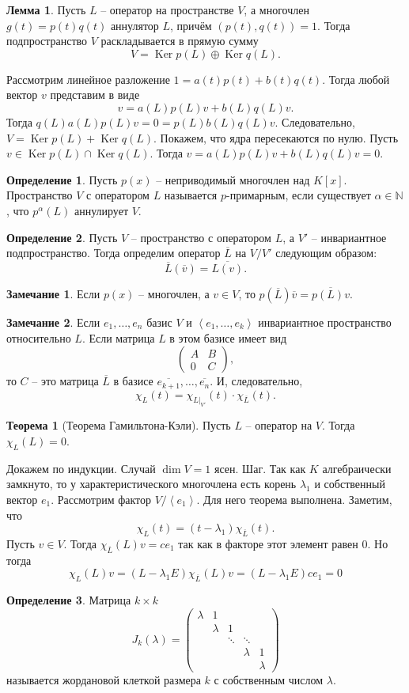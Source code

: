 \documentclass[10pt,a4paper,oneside]{book} %
\theoremstyle{definition}
\newtheorem*{rem}{Замечание}
\newtheorem*{defn}{Определение}
\newtheorem{thm}{Теорема}
\newtheorem{lem}{Лемма}
\newcommand{\mb}[1]{\mathbb{#1}}
\newcommand{\ovl}{\overline}
\DeclareMathOperator{\Ker}{Ker}
\def\lan{\left\langle }
\def\ran{\right\rangle}
\def\thrm{\begin{thm}}
\def\ethrm{\end{thm}}
\def\dfn{\begin{defn}}
\def\edfn{\end{defn}}
\def\lm{\begin{lem}}
\def\elm{\end{lem}}
\def\rm{\begin{rem}}
\def\erm{\end{rem}}
\def\pmat{\begin{pmatrix}}
\def\epmat{\end{pmatrix}}
\begin{document}
\lm Пусть $L$ -- оператор на пространстве $V$, а  многочлен $g(t)=p(t)q(t)$ аннулятор $L$, причём $(p(t),q(t))=1$. Тогда подпространство $V$ раскладывается в прямую сумму
$$V = \Ker p(L)\oplus \Ker q(L).$$
\elm
\proof Рассмотрим линейное разложение $1=a(t)p(t)+b(t)q(t)$. Тогда любой вектор $v$  представим в виде
$$v=a(L)p(L)v+ b(L)q(L)v.$$
Тогда $q(L)a(L)p(L)v=0=p(L)b(L)q(L)v$. Следовательно, $V= \Ker p(L)+\Ker q(L)$. Покажем, что ядра пересекаются по нулю. Пусть $v\in \Ker p(L) \cap \Ker q(L)$. Тогда $v=a(L)p(L)v+ b(L)q(L)v=0$.
\endproof

\dfn Пусть $p(x)$ -- неприводимый многочлен над $K[x]$. Пространство $V$ с оператором $L$ называется $p$-примарным, если существует $\alpha \in \mb N$, что $p^{\alpha}(L)$ аннулирует $V$.
\edfn

\dfn Пусть $V$ -- пространство с оператором $L$, а $V'$ -- инвариантное подпространство. Тогда определим оператор $\ovl{L}$ на $V/V'$ следующим образом:
$$\ovl{L}(\ovl{v})=\ovl{L(v)}.$$
\edfn

\rm Если $p(x)$ -- многочлен, а $v\in V$, то $p(\ovl{L})\ovl{v}=\ovl{p(L)v}$.
\erm

\rm Если $e_1,\dots,e_n$ базис $V$ и $\lan e_1,\dots,e_k\ran$ инвариантное пространство относительно $L$. Если  матрица $L$ в этом базисе имеет вид $$\pmat A& B \\ 0 & C\epmat,$$
то $C$ -- это матрица $\ovl{L}$ в базисе
$\ovl{e_{k+1}},\dots,\ovl{e_n}$.
И, следовательно, $$\chi_L(t)=\chi_{L|_{V'}}(t)\cdot \chi_{\ovl{L}}(t).$$
\erm

\thrm[Теорема Гамильтона-Кэли] Пусть $L$ -- оператор на $V$. Тогда $\chi_L(L)=0$.
\ethrm
\proof Докажем по индукции. Случай $\dim V=1$ ясен. Шаг. Так как $K$ алгебраически замкнуто, то у характеристического многочлена есть корень $\lambda_1$ и собственный вектор $e_1$. Рассмотрим фактор $V/\lan e_1\ran$. Для него теорема выполнена. Заметим, что $$\chi_L(t)= (t-\lambda_1)\chi_{\ovl{L}}(t).$$
Пусть $v \in V$. Тогда $\chi_{\ovl{L}}(L)v = ce_1$ так как в факторе этот элемент равен 0. Но тогда
$$\chi_L(L)v= (L-\lambda_1 E)\chi_{\ovl{L}}(L)v=(L-\lambda_1 E) ce_1=0$$
\endproof











\dfn
Матрица $k\times k$
$$J_k(\lambda) = \begin{pmatrix}
\lambda& 1&& \\
& \lambda &1& \\
&&\ddots &\ddots& \\
&  && \lambda & 1\\
&  &&& \lambda
\end{pmatrix}
$$
называется жордановой клеткой размера $k$ с собственным числом $\lambda$.
\edfn
\end{document}
